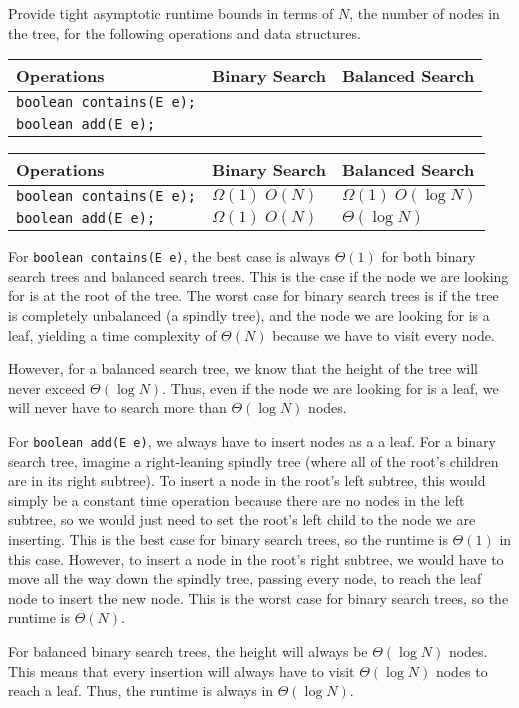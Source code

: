 \begin{blocksection}
\question Provide tight asymptotic runtime bounds in terms of $N$, the number
of nodes in the tree, for the following operations and data structures.

\ifprintanswers\else
{
\renewcommand{\arraystretch}{2}
\begin{tabularx}{\textwidth}{Xp{1.25in}p{1.25in}}
Operations                         & Binary Search      & Balanced Search \\\hline
\lstinline$boolean contains(E e);$ &                    &                 \\
\lstinline$boolean add(E e);$      &                    &
\end{tabularx}
}
\fi

\begin{solution}
{
\renewcommand{\arraystretch}{2}
\begin{tabularx}{\textwidth}{Xll}
Operations                         & Binary Search      & Balanced Search         \\\hline
\lstinline$boolean contains(E e);$ & $\Omega(1)\; O(N)$ & $\Omega(1)\; O(\log N)$ \\
\lstinline$boolean add(E e);$      & $\Omega(1)\; O(N)$ & $\Theta(\log N)$
\end{tabularx}
}

For \lstinline$boolean contains(E e)$, the best case is always $\Theta(1)$ for
both binary search trees and balanced search trees. This is the case if the
node we are looking for is at the root of the tree. The worst case for binary
search trees is if the tree is completely unbalanced (a spindly tree), and the
node we are looking for is a leaf, yielding a time complexity of $\Theta(N)$
because we have to visit every node.

However, for a balanced search tree, we know that the height of the tree will
never exceed $\Theta(\log N)$. Thus, even if the node we are looking for is a
leaf, we will never have to search more than $\Theta(\log N)$ nodes.

For \lstinline$boolean add(E e)$, we always have to insert nodes as a a leaf.
For a binary search tree, imagine a right-leaning spindly tree (where all of
the root's children are in its right subtree). To insert a node in the root's
left subtree, this would simply be a constant time operation because there are
no nodes in the left subtree, so we would just need to set the root's left
child to the node we are inserting. This is the best case for binary search
trees, so the runtime is $\Theta(1)$ in this case. However, to insert a node in
the root's right subtree, we would have to move all the way down the spindly
tree, passing every node, to reach the leaf node to insert the new node.
This is the worst case for binary search trees, so the runtime is $\Theta(N)$.

For balanced binary search trees, the height will always be $\Theta(\log N)$
nodes. This means that every insertion will always have to visit
$\Theta(\log N)$ nodes to reach a leaf. Thus, the runtime is always in
$\Theta(\log N)$.
\end{solution}
\end{blocksection}
